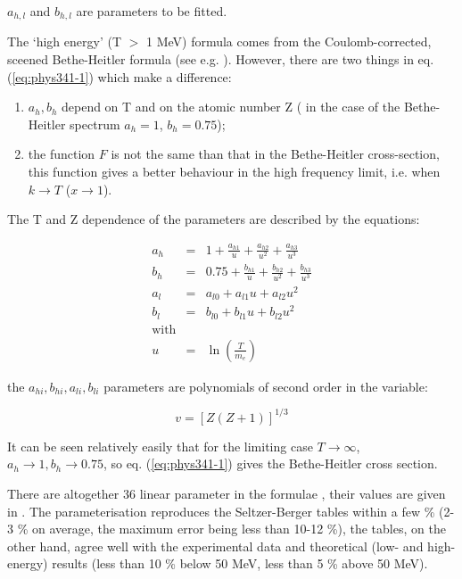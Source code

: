 $a_{h,l}$ and $b_{h,l}$ are parameters to be fitted.
 
The `high energy' (T $>$  1 MeV) formula comes from the
Coulomb-corrected, sceened Bethe-Heitler formula (see e.g. 
\cite{bib-WILL,bib-BUTC,bib-EGS3}). However, there are two things in eq. 
(\ref{eq:phys341-1}) which make a difference:
 
\begin{enumerate}
\item $a_{h}, b_{h}$ depend on T and on the atomic number Z ( in the case
of the Bethe-Heitler spectrum $a_{h} = 1$, $b_{h} =0.75$);
\item the function $F$ is not the same than that in the Bethe-Heitler
cross-section, this function gives a better behaviour in the
high frequency limit, i.e. when $k \rightarrow T$  ($x \rightarrow 1$).
\end{enumerate}
 
The T and Z dependence of the parameters are described by the equations:
 
\begin{eqnarray*}
a_{h} & = & 1 + \frac{a_{h1}}{u}+\frac{a_{h2}}{u^{2}}+\frac{a_{h3}}{u^{3}} \\
b_{h} & = & 0.75+\frac{b_{h1}}{u}+\frac{b_{h2}}{u^{2}}+\frac{b_{h3}}{u^{3}} \\
a_{l} & = & a_{l0} + a_{l1} u + a_{l2} u^{2} \\
b_{l} & = & b_{l0} + b_{l1} u + b_{l2} u^{2} \\
\mbox{with} \\
u & = & \ln \left ( \frac{T}{m_{e}} \right )
\end{eqnarray*}
 
the $a_{hi}, b_{hi}, a_{li}, b_{li}$ parameters are polynomials of second order
in the variable:

\[
v = [Z (Z+1)]^{1/3}
\]
 
It can be seen relatively easily that for the limiting case $T \rightarrow
\infty$, $a_{h} \rightarrow 1, b_{h} \rightarrow 0.75$,
so eq. (\ref{eq:phys341-1}) gives the Bethe-Heitler cross section.
 
There are altogether 36 linear parameter in the formulae , their
values are given in . The parameterisation reproduces
the Seltzer-Berger tables within a few \% (2-3 \% on average,
the maximum error being less than 10-12 \%), the tables, on the other hand,
agree well with the experimental data and theoretical (low- and high-energy)
results (less than 10 \% below 50 MeV, less than 5 \% above 50 MeV).
 
